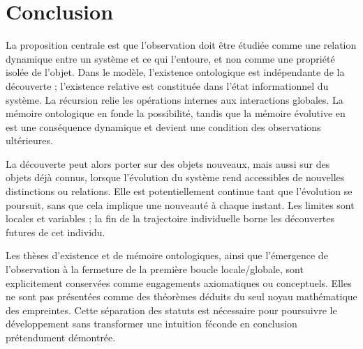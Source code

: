 \documentclass[11pt,a4paper,openany]{book}
\begin{document}
\section*{Conclusion}
La proposition centrale est que l'observation doit être étudiée comme une relation dynamique entre un système et ce qui l'entoure, et non comme une propriété isolée de l'objet. Dans le modèle, l'existence ontologique est indépendante de la découverte ; l'existence relative est constituée dans l'état informationnel du système. La récursion relie les opérations internes aux interactions globales. La mémoire ontologique en fonde la possibilité, tandis que la mémoire évolutive en est une conséquence dynamique et devient une condition des observations ultérieures.

La découverte peut alors porter sur des objets nouveaux, mais aussi sur des objets déjà connus, lorsque l'évolution du système rend accessibles de nouvelles distinctions ou relations. Elle est potentiellement continue tant que l'évolution se poursuit, sans que cela implique une nouveauté à chaque instant. Les limites sont locales et variables ; la fin de la trajectoire individuelle borne les découvertes futures de cet individu.

Les thèses d'existence et de mémoire ontologiques, ainsi que l'émergence de l'observation à la fermeture de la première boucle locale/globale, sont explicitement conservées comme engagements axiomatiques ou conceptuels. Elles ne sont pas présentées comme des théorèmes déduits du seul noyau mathématique des empreintes. Cette séparation des statuts est nécessaire pour poursuivre le développement sans transformer une intuition féconde en conclusion prétendument démontrée.
\end{document}
